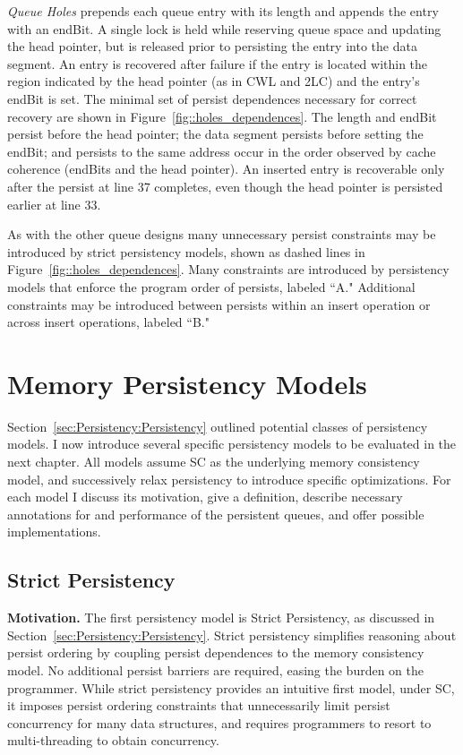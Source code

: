 

\emph{Queue Holes} prepends each queue entry with its length and appends the entry with an endBit.
A single lock is held while reserving queue space and updating the head pointer, but is released prior to persisting the entry into the data segment.
An entry is recovered after failure if the entry is located within the region indicated by the head pointer (as in CWL and 2LC) and the entry's endBit is set.
The minimal set of persist dependences necessary for correct recovery are shown in Figure~\ref{fig::holes_dependences}.
The length and endBit persist before the head pointer; the data segment persists before setting the endBit; and persists to the same address occur in the order observed by cache coherence (endBits and the head pointer).
An inserted entry is recoverable only after the persist at line 37 completes, even though the head pointer is persisted earlier at line 33.

As with the other queue designs many unnecessary persist constraints may be introduced by strict persistency models, shown as dashed lines in Figure~\ref{fig::holes_dependences}.
Many constraints are introduced by persistency models that enforce the program order of persists, labeled ``A."
Additional constraints may be introduced between persists within an insert operation or across insert operations, labeled ``B."

\section{Memory Persistency Models}
\label{sec:PersistencyModels:Models}

Section~\ref{sec:Persistency:Persistency} outlined potential classes of persistency models.
I now introduce several specific persistency models to be evaluated in the next chapter.
All models assume SC as the underlying memory consistency model, and successively relax persistency to introduce specific optimizations.
For each model I discuss its motivation, give a definition, describe necessary annotations for and performance of the persistent queues, and offer possible implementations.

\subsection{Strict Persistency}
\label{section:PersistencyModels:Strict}

\textbf{Motivation.}
The first persistency model is Strict Persistency, as discussed in Section~\ref{sec:Persistency:Persistency}.
Strict persistency simplifies reasoning about persist ordering by coupling persist dependences to the memory consistency model.
No additional persist barriers are required, easing the burden on the programmer.
While strict persistency provides an intuitive first model, under SC, it imposes persist ordering constraints that unnecessarily limit persist concurrency for many data structures, and requires programmers to resort to multi-threading to obtain concurrency.

